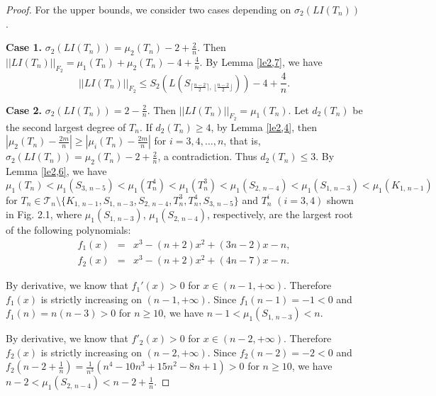 \documentclass[12pt, a4paper]{article}
\begin{document}
\begin{proof} For the upper bounds, we consider two cases depending on $\sigma_2(LI(T_n))$.

{\bf Case 1.} $\sigma_2(LI(T_n))=\mu_2(T_n)-2+\frac{2}{n}$. Then $||LI(T_n)||_{F_2}=\mu_1(T_n)+\mu_2(T_n)-4+\frac{4}{n}$. By Lemma \ref{le2,7}, we have
$$||LI(T_n)||_{F_2}\leq S_2(L(S_{\lceil\frac{n-2}{2}\rceil, \, \lfloor\frac{n-2}{2}\rfloor}))-4+\frac{4}{n}.$$

{\bf Case 2.} $\sigma_2(LI(T_n))=2-\frac{2}{n}$. Then $||LI(T_n)||_{F_2}= \mu_1(T_n)$. Let $d_2(T_n)$ be the second largest degree of $T_n$. If $d_2(T_n)\geq 4$, by Lemma \ref{le2,4}, then $\left\lvert\mu_2(T_n)-\frac{2m}{n}\right\lvert\geq \left\lvert\mu_i(T_n)-\frac{2m}{n}\right\lvert$ for $i=3,4,\ldots, n$, that is, $\sigma_2(LI(T_n))=\mu_2(T_n)-2+\frac{2}{n}$, a contradiction. Thus $d_2(T_n)\leq 3$. By Lemma \ref{le2,6}, we have $$\mu_1(T_n)<\mu_1(S_{3,\, n-5})<\mu_1(T_n^4)<\mu_1(T_n^3)<\mu_1(S_{2,\, n-4})<\mu_1(S_{1,\, n-3})<\mu_1(K_{1,\,n-1})$$
for $T_n\in \mathcal{T}_n\setminus \{K_{1,\,n-1}, S_{1,\, n-3}, S_{2,\, n-4}, T_n^3, T_n^4, S_{3,\, n-5} \}$ and $T_n^i$ $(i=3, 4)$ shown in Fig. 2.1, where $\mu_1(S_{1,\, n-3})$, $\mu_1(S_{2,\, n-4})$, respectively, are the largest root of the following polynomials:
\begin{eqnarray*}
f_1(x) & = & x^3-(n+2)x^2+(3n-2)x-n,\\
f_2(x) & = & x^3-(n+2)x^2+(4n-7)x-n.
\end{eqnarray*}

By derivative, we know that $f_1'(x)>0$ for $x\in (n-1, +\infty)$. Therefore $f_1(x)$ is strictly increasing on $(n-1, +\infty)$.
Since $f_1(n-1)=-1<0$ and $f_1(n)=n(n-3)>0$ for $n\geq 10$, we have $n-1<\mu_1(S_{1,\,n-3})<n$.

By derivative, we know that $f'_2(x)>0$ for $x\in (n-2, +\infty)$. Therefore $f_2(x)$ is strictly increasing on $(n-2, +\infty)$.
Since $f_2(n-2)=-2<0$ and $f_2(n-2+\frac{1}{n})=\frac{1}{n^3}(n^4-10n^3+15n^2-8n+1)>0$ for $n\geq 10$, we have $n-2<\mu_1(S_{2,\,n-4})<n-2+\frac{1}{n}$.


\end{proof}
\end{document}
